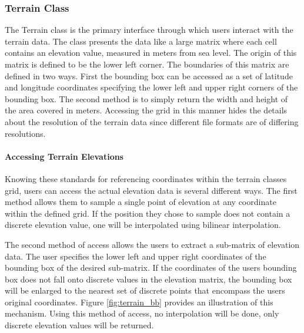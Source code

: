 \subsubsection{Terrain Class}
The Terrain class is the primary interface through which users interact with the terrain data.  The class presents the data like a large matrix where each cell contains an elevation value, measured in meters from sea level.  The origin of this matrix is defined to be the lower left corner.  The boundaries of this matrix are defined in two ways.  First the bounding box can be accessed as a set of latitude and longitude coordinates specifying the lower left and upper right corners of the bounding box.  The second method is to simply return the width and height of the area covered in meters.  Accessing the grid in this manner hides the details about the resolution of the terrain data since different file formats are of differing resolutions.

\paragraph{Accessing Terrain Elevations}
Knowing these standards for referencing coordinates within the terrain classes grid, users can access the actual elevation data is several different ways.  The first method allows them to sample a single point of elevation at any coordinate within the defined grid.  If the position they chose to sample does not contain a discrete elevation value, one will be interpolated using bilinear interpolation.

The second method of access allows the users to extract a sub-matrix of elevation data.  The user specifies the lower left and upper right coordinates of the bounding box of the desired sub-matrix.  If the coordinates of the users bounding box does not fall onto discrete values in the elevation matrix, the bounding box will be enlarged to the nearest set of discrete points that encompass the users original coordinates.  Figure \ref{fig:terrain_bb} provides an illustration of this mechanism.  Using this method of access, no interpolation will be done, only discrete elevation values will be returned.


